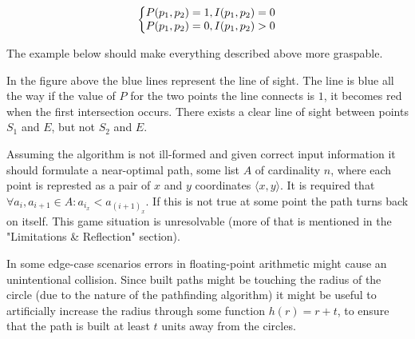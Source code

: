 \documentclass[12pt, titlepage]{article}
\begin{document}
\begin{equation}
    \left\{\begin{array}{@{}l@{}}
       P(p_1, p_2) = 1, I(p_1, p_2) = 0\\
       P(p_1, p_2) = 0, I(p_1, p_2) > 0\\
    \end{array}\right.
\end{equation}

The example below should make everything described above more graspable.

\begin{center}
    
In the figure above the blue lines represent the line of sight. The line
is blue all the way if the value of $P$ for the two points the line connects
is $1$, it becomes red when the first intersection occurs. There exists
a clear line of sight between points $S_1$ and $E$, but not $S_2$ and $E$.
\end{center}

Assuming the algorithm is not ill-formed and given correct input information
it should formulate a near-optimal path, some list $A$ of cardinality $n$, 
where each point is represted as  a pair of $x$ and $y$ coordinates 
$\langle x, y \rangle$. It is required that
$\forall a_i,a_{i+1} \in A : a_{i_x} < a_{{(i+1)}_x}$. If this is not true 
at some point the path turns back on itself. This game situation is unresolvable 
(more of that is mentioned in the "Limitations \& Reflection" section).

In some edge-case scenarios errors in floating-point arithmetic might 
cause an unintentional collision. Since built paths might be touching 
the radius of the circle (due to the nature of the pathfinding algorithm) it might be
useful to artificially increase the radius through some function $h(r) = r + t$,
to ensure that the path is built at least $t$ units away from the circles.
\end{document}
